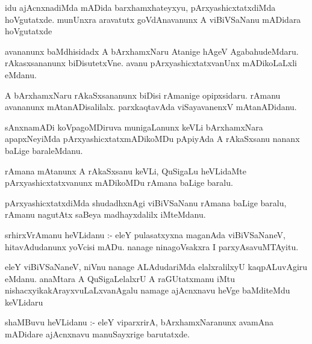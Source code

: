 \documentclass{article}
\begin{document}
\begin{mn}
idu  ajAcnxnadiMda  mADida  barxhamxhateyxyu,  pArxyashicxtatxdiMda  hoVgutatxde.  munUnxra  aravatutx  goVdAnavanunx  A  
viBiVSaNanu  mADidara  hoVgutatxde
\end{mn}

\begin{mn}
avananunx  baMdhisidadx  A  bArxhamxNaru  Atanige  hAgeV  AgabahudeMdaru.  rAkasxsananunx  biDisutetxVne.  avanu  
pArxyashicxtatxvanUnx  mADikoLaLxli  eMdanu.
\end{mn}

\begin{mn}
A  bArxhamxNaru  rAkaSxsananunx  biDisi  rAmanige  opipxsidaru.  rAmanu  avananunx  mAtanADisalilalx.  parxkaqtavAda  
viSayavanenxV  mAtanADidanu.
\end{mn}

\begin{mn}
sAnxnamADi  koVpagoMDiruva  munigaLanunx  keVLi  bArxhamxNara  apapxNeyiMda  pArxyashicxtatxmADikoMDu  pApiyAda  A  
rAkaSxsanu  nananx  baLige  baraleMdanu.
\end{mn}

\begin{mn}
rAmana  mAtanunx  A  rAkaSxsanu  keVLi,  QuSigaLu  heVLidaMte  pArxyashicxtatxvanunx  mADikoMDu  rAmana  baLige  baralu.
\end{mn}

\begin{mn}
pArxyashicxtatxdiMda  shudadhxnAgi  viBiVSaNanu  rAmana  baLige  baralu,  rAmanu  nagutAtx  saBeya  madhayxdalilx  iMteMdanu.
\end{mn}

\begin{mn}
srhirxVrAmanu  heVLidanu :- eleY  pulasatxyxna  maganAda  viBiVSaNaneV,  hitavAdudanunx  yoVcisi  mADu.  nanage  ninagoVsakxra  
I  parxyAsavuMTAyitu.
\end{mn}

\begin{mn}
eleY  viBiVSaNaneV,  niVnu  nanage  ALAdudariMda  elalxralilxyU  kaqpALuvAgiru  eMdanu.  anaMtara  A  QuSigaLelalxrU  A  raGUtatxmanu  
iMtu  nishacxyikakArayxvuLaLxvanAgalu  namage  ajAcnxnavu  heVge  baMditeMdu  keVLidaru
\end{mn}

\begin{mn}
shaMBuvu  heVLidanu :- eleY  viparxrirA,  bArxhamxNaranunx  avamAna mADidare  ajAcnxnavu  manuSayxrige  barutatxde.
\end{mn}
\end{document}
